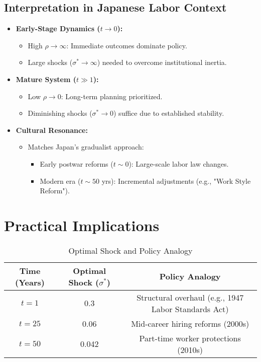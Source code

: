 \documentclass[10pt]{article}
\theoremstyle{definition}
\begin{document}
\subsection{Interpretation in Japanese Labor Context}

\begin{itemize}
    \item \textbf{Early-Stage Dynamics ($t \rightarrow 0$):}
        \begin{itemize}
            \item High $\rho \rightarrow \infty$: Immediate outcomes dominate policy.
            \item Large shocks ($\sigma^* \rightarrow \infty$) needed to overcome institutional inertia.
        \end{itemize}
    \item \textbf{Mature System ($t \gg 1$):}
        \begin{itemize}
            \item Low $\rho \rightarrow 0$: Long-term planning prioritized.
            \item Diminishing shocks ($\sigma^* \rightarrow 0$) suffice due to established stability.
        \end{itemize}
    \item \textbf{Cultural Resonance:}
        \begin{itemize}
            \item Matches Japan’s gradualist approach:
                \begin{itemize}
                    \item Early postwar reforms ($t \sim 0$): Large-scale labor law changes.
                    \item Modern era ($t \sim 50$ yrs): Incremental adjustments (e.g., "Work Style Reform").
                \end{itemize}
        \end{itemize}
\end{itemize}

\section{Practical Implications}

\begin{table}[htbp]
\centering
\caption{Optimal Shock and Policy Analogy} %
\begin{tabular}{ccc}
\hline
Time (Years) & Optimal Shock ($\sigma^*$) & Policy Analogy \\
\hline
$t = 1$ & 0.3 & Structural overhaul (e.g., 1947 Labor Standards Act) \\
$t = 25$ & 0.06 & Mid-career hiring reforms (2000s) \\
$t = 50$ & 0.042 & Part-time worker protections (2010s) \\
\hline
\end{tabular}
\label{tab:optimal_shock}
\end{table}
\end{document}
